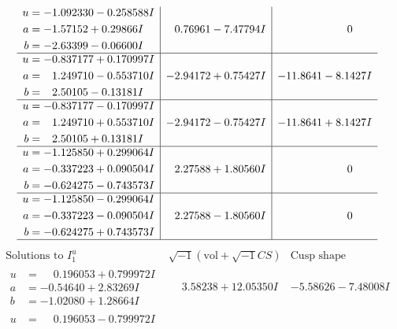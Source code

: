 \documentclass[1p]{elsarticle_modified}
\theoremstyle{definition}
\newcommand{\I}{\sqrt{-1}}
\begin{document}
$$\begin{array}{c|c|c}
\begin{aligned}
u &= -1.092330 - 0.258588 I \\
a &= -1.57152 + 0.29866 I \\
b &= -2.63399 - 0.06600 I\end{aligned}
 & \phantom{-}0.76961 - 7.47794 I & \phantom{-0.000000 } 0 \\ \hline\begin{aligned}
u &= -0.837177 + 0.170997 I \\
a &= \phantom{-}1.249710 - 0.553710 I \\
b &= \phantom{-}2.50105 - 0.13181 I\end{aligned}
 & -2.94172 + 0.75427 I & -11.8641 - 8.1427 I \\ \hline\begin{aligned}
u &= -0.837177 - 0.170997 I \\
a &= \phantom{-}1.249710 + 0.553710 I \\
b &= \phantom{-}2.50105 + 0.13181 I\end{aligned}
 & -2.94172 - 0.75427 I & -11.8641 + 8.1427 I \\ \hline\begin{aligned}
u &= -1.125850 + 0.299064 I \\
a &= -0.337223 + 0.090504 I \\
b &= -0.624275 - 0.743573 I\end{aligned}
 & \phantom{-}2.27588 + 1.80560 I & \phantom{-0.000000 } 0 \\ \hline\begin{aligned}
u &= -1.125850 - 0.299064 I \\
a &= -0.337223 - 0.090504 I \\
b &= -0.624275 + 0.743573 I\end{aligned}
 & \phantom{-}2.27588 - 1.80560 I & \phantom{-0.000000 } 0\\
 \hline 
 \end{array}$$\newpage$$\begin{array}{c|c|c}  
\text{Solutions to }I^u_{1}& \I (\text{vol} + \sqrt{-1}CS) & \text{Cusp shape}\\
 \hline 
\begin{aligned}
u &= \phantom{-}0.196053 + 0.799972 I \\
a &= -0.54640 + 2.83269 I \\
b &= -1.02080 + 1.28664 I\end{aligned}
 & \phantom{-}3.58238 + 12.05350 I & -5.58626 - 7.48008 I \\ \hline\begin{aligned}
u &= \phantom{-}0.196053 - 0.799972 I \\

\end{aligned}
\end{array}$$
\end{document}
